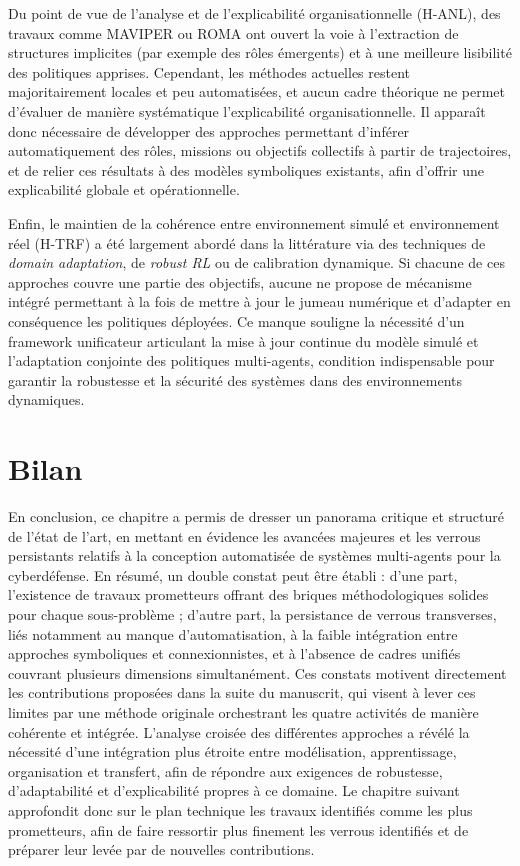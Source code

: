 Du point de vue de l’analyse et de l’explicabilité organisationnelle (H-ANL), des travaux comme MAVIPER ou ROMA ont ouvert la voie à l’extraction de structures implicites (par exemple des rôles émergents) et à une meilleure lisibilité des politiques apprises. Cependant, les méthodes actuelles restent majoritairement locales et peu automatisées, et aucun cadre théorique ne permet d’évaluer de manière systématique l’explicabilité organisationnelle. Il apparaît donc nécessaire de développer des approches permettant d’inférer automatiquement des rôles, missions ou objectifs collectifs à partir de trajectoires, et de relier ces résultats à des modèles symboliques existants, afin d’offrir une explicabilité globale et opérationnelle.

Enfin, le maintien de la cohérence entre environnement simulé et environnement réel (H-TRF) a été largement abordé dans la littérature via des techniques de \textit{domain adaptation}, de \textit{robust RL} ou de calibration dynamique. Si chacune de ces approches couvre une partie des objectifs, aucune ne propose de mécanisme intégré permettant à la fois de mettre à jour le jumeau numérique et d’adapter en conséquence les politiques déployées. Ce manque souligne la nécessité d’un framework unificateur articulant la mise à jour continue du modèle simulé et l’adaptation conjointe des politiques multi-agents, condition indispensable pour garantir la robustesse et la sécurité des systèmes dans des environnements dynamiques.



\section*{Bilan}
\noindent En conclusion, ce chapitre a permis de dresser un panorama critique et structuré de l’état de l’art, en mettant en évidence les avancées majeures et les verrous persistants relatifs à la conception automatisée de systèmes multi-agents pour la cyberdéfense. En résumé, un double constat peut être établi : d’une part, l’existence de travaux prometteurs offrant des briques méthodologiques solides pour chaque sous-problème ; d’autre part, la persistance de verrous transverses, liés notamment au manque d’automatisation, à la faible intégration entre approches symboliques et connexionnistes, et à l’absence de cadres unifiés couvrant plusieurs dimensions simultanément. Ces constats motivent directement les contributions proposées dans la suite du manuscrit, qui visent à lever ces limites par une méthode originale orchestrant les quatre activités de manière cohérente et intégrée. L’analyse croisée des différentes approches a révélé la nécessité d’une intégration plus étroite entre modélisation, apprentissage, organisation et transfert, afin de répondre aux exigences de robustesse, d’adaptabilité et d’explicabilité propres à ce domaine. Le chapitre suivant approfondit donc sur le plan technique les travaux identifiés comme les plus prometteurs, afin de faire ressortir plus finement les verrous identifiés et de préparer leur levée par de nouvelles contributions.

